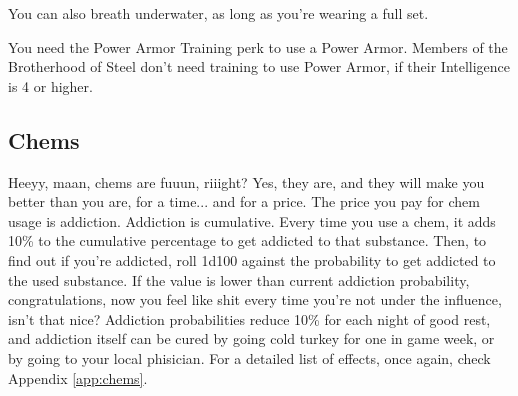 You can also breath underwater, as long as you're wearing a full set.

You need the Power Armor Training perk to use a Power Armor. Members of the Brotherhood of Steel don't need training to use Power Armor, if their Intelligence is 4 or higher.

\subsection{Chems}

Heeyy, maan, chems are fuuun, riiight? Yes, they are, and they will make you better than you are, for a time... and for a price. The price you pay for chem usage is addiction. Addiction is cumulative. Every time you use a chem, it adds 10\% to the cumulative percentage to get addicted to that substance. Then, to find out if you're addicted, roll 1d100 against the probability to get addicted to the used substance. If the value is lower than current addiction probability, congratulations, now you feel like shit every time you're not under the influence, isn't that nice? Addiction probabilities reduce 10\% for each night of good rest, and addiction itself can be cured by going cold turkey for one in game week, or by going to your local phisician. For a detailed list of effects, once again, check Appendix \ref{app:chems}. 

